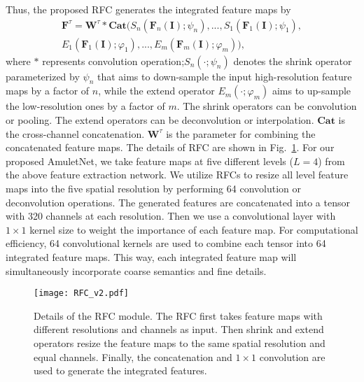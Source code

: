 \documentclass[10pt,twocolumn,letterpaper]{article}
\begin{document}
Thus, the proposed RFC generates the integrated feature maps by
\begin{equation}
  \label{equ:equ1}
\begin{aligned}
 \textbf{F}^{\tau} = \textbf{W}^{\tau}*\textbf{Cat}(S_{n}(\textbf{F}_{n}(\textbf{I});\psi_{n}),...,S_{1}(\textbf{F}_{1}(\textbf{I});\psi_{1}),\\ E_{1}(\textbf{F}_{1}(\textbf{I});\varphi_{1}),...,E_{m}(\textbf{F}_{m}(\textbf{I});\varphi_{m})),
\end{aligned}
\end{equation}
where $*$ represents convolution operation;$S_{n}(\cdot;\psi_{n})$ denotes the shrink operator parameterized by $\psi_{n}$ that aims to down-sample the input high-resolution feature maps by a factor of $n$, while the extend operator $E_{m}(\cdot;\varphi_{m})$ aims to up-sample the low-resolution ones by a factor of $m$.
The shrink operators can be convolution or pooling. The extend operators can be deconvolution or interpolation.
$\textbf{Cat}$ is the cross-channel concatenation.
$\textbf{W}^{\tau}$ is the parameter for combining the concatenated feature maps.
The details of RFC are shown in Fig.~\ref{fig:RFC}.
For our proposed AmuletNet, we take feature maps at five different levels ($L=4$) from the above feature extraction network.
We utilize RFCs to resize all level feature maps into the five spatial resolution by performing 64 convolution or deconvolution operations.
The generated features are concatenated into a tensor with 320 channels at each resolution.
Then we use a convolutional layer with $1\times 1$ kernel size to weight the importance of each feature map.
For computational efficiency, 64 convolutional kernels are used to combine each tensor into 64 integrated feature maps.
This way, each integrated feature map will simultaneously incorporate coarse semantics and fine details.
\begin{figure}
\begin{center}
\texttt{[image: RFC\_v2.pdf]}
\end{center}
\vspace{-4mm}
\caption{Details of the RFC module. The RFC first takes feature maps with different resolutions and channels as input. Then shrink and extend operators resize the feature maps to the same spatial resolution and equal channels. Finally, the concatenation and $1\times1$ convolution are used to generate the integrated features.}
\label{fig:RFC}
\vspace{-5mm}
\end{figure}
\end{document}
